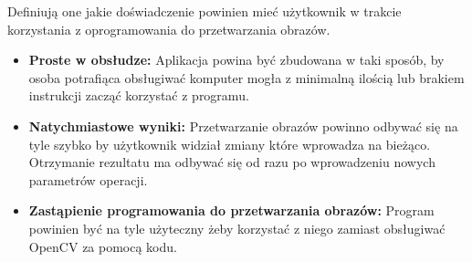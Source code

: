 Definiują one jakie doświadczenie powinien mieć użytkownik w trakcie korzystania z oprogramowania do przetwarzania obrazów.
\begin{itemize}
    \item \textbf{Proste w obsłudze:} Aplikacja powina być zbudowana w taki sposób, by osoba potrafiąca obsługiwać komputer mogła z minimalną ilością lub brakiem instrukcji zacząć korzystać z programu.
    \item \textbf{Natychmiastowe wyniki:} Przetwarzanie obrazów powinno odbywać się na tyle szybko by użytkownik widział zmiany które wprowadza na bieżąco. Otrzymanie rezultatu ma odbywać się od razu po wprowadzeniu nowych parametrów operacji.
    \item \textbf{Zastąpienie programowania do przetwarzania obrazów:} Program powinien być na tyle użyteczny żeby korzystać z niego zamiast obsługiwać OpenCV za pomocą kodu. 
\end{itemize}